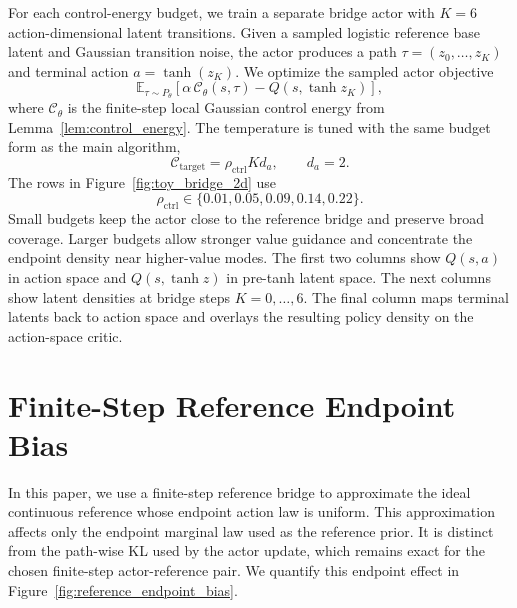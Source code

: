 \documentclass[11pt]{article}
\begin{document}
For each control-energy budget, we train a separate bridge actor with $K=6$ action-dimensional latent transitions. Given a sampled logistic reference base latent and Gaussian transition noise, the actor produces a path $\tau=(z_0,\ldots,z_K)$ and terminal action $a=\tanh(z_K)$. We optimize the sampled actor objective
\begin{equation}
  \mathbb E_{\tau\sim P_\theta}
  \left[
    \alpha\,\mathcal C_\theta(s,\tau)
    -
    Q(s,\tanh z_K)
  \right],
\end{equation}
where $\mathcal C_\theta$ is the finite-step local Gaussian control energy from Lemma~\ref{lem:control_energy}. The temperature is tuned with the same budget form as the main algorithm,
\begin{equation}
  \mathcal C_{\mathrm{target}}
  =
  \rho_{\mathrm{ctrl}} K d_a,
  \qquad d_a=2.
\end{equation}
The rows in Figure~\ref{fig:toy_bridge_2d} use
\begin{equation}
  \rho_{\mathrm{ctrl}}\in\{0.01,0.05,0.09,0.14,0.22\}.
\end{equation}
Small budgets keep the actor close to the reference bridge and preserve broad coverage. Larger budgets allow stronger value guidance and concentrate the endpoint density near higher-value modes. The first two columns show $Q(s,a)$ in action space and $Q(s,\tanh z)$ in pre-tanh latent space. The next columns show latent densities at bridge steps $K=0,\ldots,6$. The final column maps terminal latents back to action space and overlays the resulting policy density on the action-space critic.

\section{Finite-Step Reference Endpoint Bias}
\label{app:finite_reference_bias}

In this paper, we use a finite-step reference bridge to approximate the ideal continuous reference whose endpoint action law is uniform. This approximation affects only the endpoint marginal law used as the reference prior. It is distinct from the path-wise KL used by the actor update, which remains exact for the chosen finite-step actor-reference pair. We quantify this endpoint effect in Figure~\ref{fig:reference_endpoint_bias}.
\end{document}
